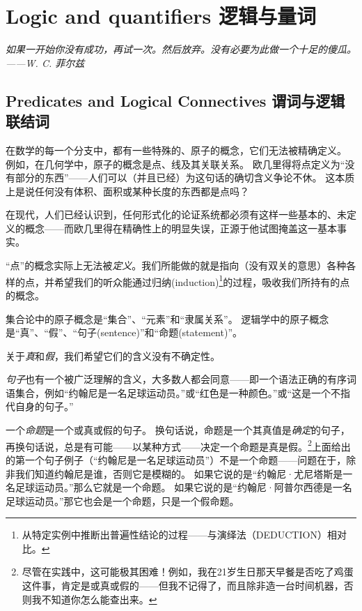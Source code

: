 
\chapter{Logic and quantifiers 逻辑与量词}
\label{ch:logic}

{\em 如果一开始你没有成功，再试一次。然后放弃。没有必要为此做一个十足的傻瓜。——W. C. 菲尔兹}

\section{Predicates and Logical Connectives 谓词与逻辑联结词}
\label{sec:pred}


在数学的每一个分支中，都有一些特殊的、原子的概念，它们无法被精确定义。
例如，在几何学中，原子的概念是点、线及其关联关系。
欧几里得将点定义为“没有部分的东西”——人们可以（并且已经）为这句话的确切含义争论不休。
这本质上是说任何没有体积、面积或某种长度的东西都是点吗？

在现代，人们已经认识到，任何形式化的论证系统都必须有这样一些基本的、未定义的概念——而欧几里得在精确性上的明显失误，正源于他试图掩盖这一基本事实。

“点”的概念实际上无法被{\em 定义}。我们所能做的就是指向（没有双关的意思）各种各样的点，并希望我们的听众能通过归纳(induction)\footnote{从特定实例中推断出普遍性结论的过程——与演绎法（DEDUCTION）相对比。}的过程，吸收我们所持有的点的概念。

集合论中的原子概念是“集合”、“元素”和“隶属关系”。
逻辑学中的原子概念是“真”、“假”、“句子(sentence)”和“命题(statement)”。

关于{\em 真}和{\em 假}，我们希望它们的含义没有不确定性。

{\em 句子}也有一个被广泛理解的含义，大多数人都会同意——即一个语法正确的有序词语集合，例如“约翰尼是一名足球运动员。”或“红色是一种颜色。”或“这是一个不指代自身的句子。”

一个{\em 命题}是一个或真或假的句子。
换句话说，命题是一个其真值是{\em 确定}的句子，再换句话说，总是有可能——以某种方式——决定一个命题是真是假。\footnote{尽管在实践中，这可能极其困难！例如，我在21岁生日那天早餐是否吃了鸡蛋这件事，肯定是或真或假的——但我不记得了，而且除非造一台时间机器，否则我不知道你怎么能查出来。}上面给出的第一个句子例子（“约翰尼是一名足球运动员”）不是一个命题——问题在于，除非我们知道约翰尼是谁，否则它是模糊的。
如果它说的是“约翰尼·尤尼塔斯是一名足球运动员。”那么它就是一个命题。
如果它说的是“约翰尼·阿普尔西德是一名足球运动员。”那它也会是一个命题，只是一个假命题。

